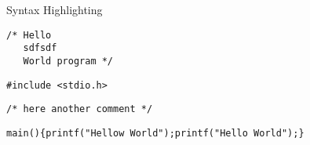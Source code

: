 \begin{frame}{Syntax Highlighting}~\color{Rhodamine}\begin{verbatim}/* Hello
   sdfsdf
   World program */\end{verbatim}\leavevmode\newline\newline\color{Gray}\verb$#include <stdio.h>$\newline\color{Rhodamine}\begin{verbatim}/* here another comment */\end{verbatim}\leavevmode\newline\color{Aquamarine}\verb$main$\color{Fuchsia}\verb$($\color{Fuchsia}\verb$)$\newline\color{Fuchsia}\verb${$\newline\tab\color{Aquamarine}\verb$printf$\color{Fuchsia}\verb$($\color{Emerald}\verb$"Hellow World"$\color{Fuchsia}\verb$)$\color{Fuchsia}\verb$;$\newline\tab\color{Aquamarine}\verb$printf$\color{Fuchsia}\verb$($\color{Emerald}\verb$"Hello World"$\color{Fuchsia}\verb$)$\color{Fuchsia}\verb$;$\newline\color{Fuchsia}\verb$}$\newline
\end{frame}
